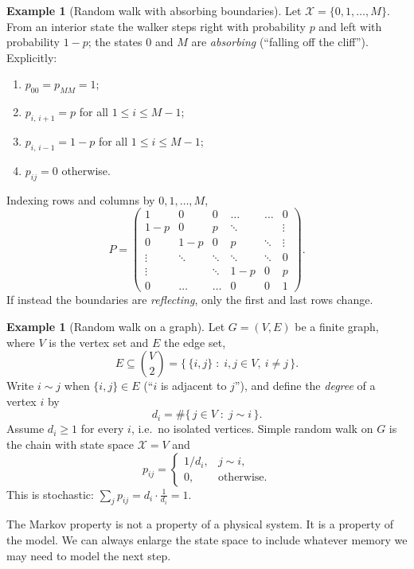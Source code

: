 \documentclass[11pt]{article}
\theoremstyle{definition}
\newtheorem{example}[theorem]{Example}
\theoremstyle{remark}
\newcommand{\X}{\mathcal{X}}
\begin{document}
\begin{example}[Random walk with absorbing boundaries]
Let \(\X = \{0, 1, \dots, M\}\). From an interior state the walker steps right with probability \(p\) and left with
probability \(1 - p\); the states \(0\) and \(M\) are \emph{absorbing} (``falling off the cliff''). Explicitly:
\begin{enumerate}
    \item \(p_{00} = p_{MM} = 1\);

    \item \(p_{i,\,i+1} = p\) for all \(1 \le i \le M-1\);

    \item \(p_{i,\,i-1} = 1 - p\) for all \(1 \le i \le M-1\);

    \item \(p_{ij} = 0\) otherwise.
\end{enumerate}
Indexing rows and columns by \(0, 1, \dots, M\),
\begin{equation*}
    P = \begin{pmatrix}
        1   & 0   & 0   & \dots  & \dots & 0 \\
        1-p & 0   & p   & \ddots &       & \vdots \\
        0   & 1-p & 0   & p      & \ddots & \vdots \\
        \vdots & \ddots & \ddots & \ddots & \ddots & 0 \\
        \vdots &     & \ddots & 1-p & 0 & p \\
        0   & \dots & \dots & 0 & 0 & 1
    \end{pmatrix}.
\end{equation*}
If instead the boundaries are \emph{reflecting}, only the first and last rows change.
\end{example}

\begin{example}[Random walk on a graph]
Let \(G = (V, E)\) be a finite graph, where \(V\) is the vertex set and \(E\) the edge set,
\begin{equation*}
    E \subseteq \binom{V}{2} = \bigl\{\, \{i, j\} \;:\; i, j \in V,\ i \neq j \,\bigr\}.
\end{equation*}
Write \(i \sim j\) when \(\{i, j\} \in E\) (``\(i\) is adjacent to \(j\)''), and define the \emph{degree} of a vertex
\(i\) by
\begin{equation*}
    d_i = \#\{\, j \in V \;:\; j \sim i \,\}.
\end{equation*}
Assume \(d_i \ge 1\) for every \(i\), i.e.\ no isolated vertices. Simple random walk on \(G\) is the chain with state
space \(\X = V\) and
\begin{equation*}
    p_{ij} = \begin{cases}
        1/d_i, & j \sim i, \\
        0,     & \text{otherwise.}
    \end{cases}
\end{equation*}
This is stochastic: \(\sum_{j} p_{ij} = d_i \cdot \frac{1}{d_i} = 1\).
\end{example}

The Markov property is not a property of a physical system. It is a property of the model. We can always enlarge the state space to include whatever memory we may need to model the next step.
\end{document}
